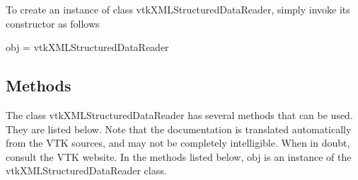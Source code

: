 To create an instance of class vtk\-X\-M\-L\-Structured\-Data\-Reader, simply invoke its constructor as follows \begin{DoxyVerb}  obj = vtkXMLStructuredDataReader
\end{DoxyVerb}
 \hypertarget{vtkwidgets_vtkxyplotwidget_Methods}{}\subsection{Methods}\label{vtkwidgets_vtkxyplotwidget_Methods}
The class vtk\-X\-M\-L\-Structured\-Data\-Reader has several methods that can be used. They are listed below. Note that the documentation is translated automatically from the V\-T\-K sources, and may not be completely intelligible. When in doubt, consult the V\-T\-K website. In the methods listed below, {\ttfamily obj} is an instance of the vtk\-X\-M\-L\-Structured\-Data\-Reader class. 
